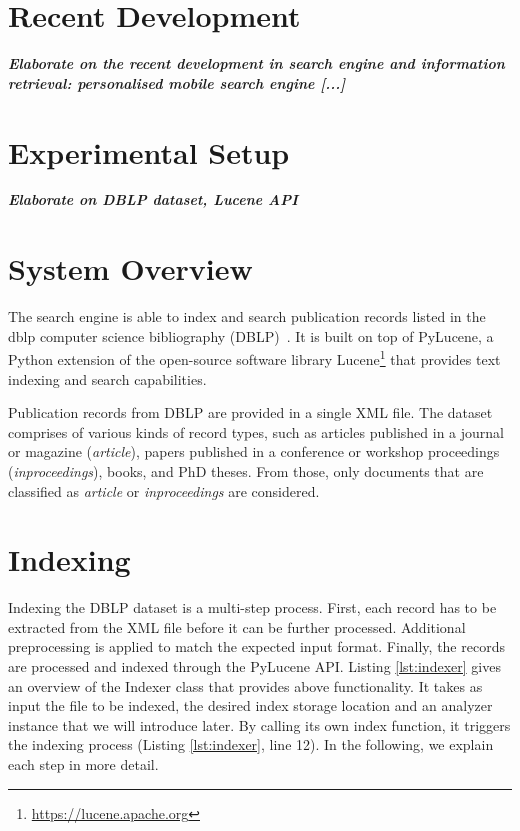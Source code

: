 \documentclass{sig-alternate-05-2015}
\begin{document}
\section{Recent Development}
\textit{\textbf{Elaborate on the recent development in search engine and information retrieval: personalised mobile search engine [...]}}
\section{Experimental Setup}
\textit{\textbf{Elaborate on DBLP dataset, Lucene API}}

\section{System Overview}

The search engine is able to index and search publication records listed in the dblp computer science bibliography (DBLP)~\cite{dblp}. It is built on top of PyLucene, a Python extension of the open-source software library Lucene\footnote{\url{https://lucene.apache.org}} that provides text indexing and search capabilities.

Publication records from DBLP are provided in a single XML file. The dataset comprises of various kinds of record types, such as articles published in a journal or magazine (\emph{article}), papers published in a conference or workshop proceedings (\emph{inproceedings}), books, and PhD theses. From those, only documents that are classified as \emph{article} or \emph{inproceedings} are considered.

\section{Indexing}

Indexing the DBLP dataset is a multi-step process. First, each record has to be extracted from the XML file before it can be further processed. Additional preprocessing is applied to match the expected input format. Finally, the records are processed and indexed through the PyLucene API. Listing \ref{lst:indexer} gives an overview of the Indexer class that provides above functionality. It takes as input the file to be indexed, the desired index storage location and an analyzer instance that we will introduce later. By calling its own index function, it triggers the indexing process (Listing \ref{lst:indexer}, line 12). In the following, we explain each step in more detail.
\end{document}
